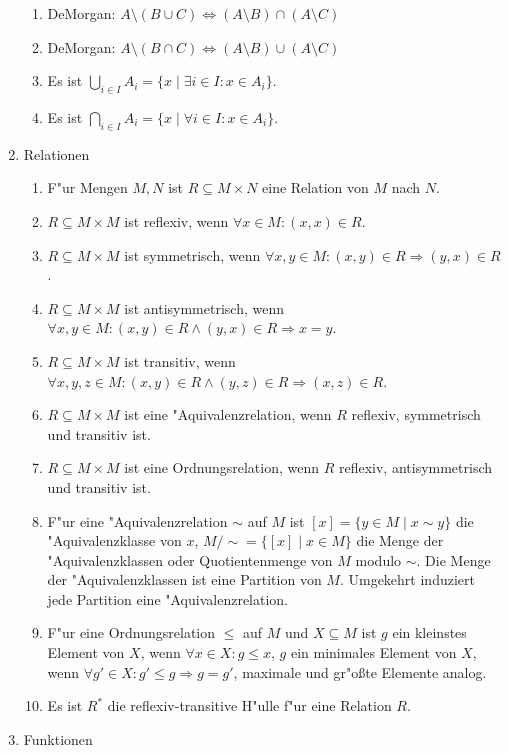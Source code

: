 \begin{enumerate}
\begin{enumerate}
    \item DeMorgan: $A\setminus (B\cup C) \Leftrightarrow (A\setminus B) \cap (A\setminus C)$
    \item DeMorgan: $A\setminus (B\cap C) \Leftrightarrow (A\setminus B) \cup (A\setminus C)$
    \item Es ist $\bigcup_{i\in I}A_i = \{x\mid \exists i\in I: x\in A_i\}$. 
    \item Es ist $\bigcap_{i\in I}A_i = \{x\mid\forall i\in I: x\in A_i\}$.
\end{enumerate}
\item Relationen
\begin{enumerate}
    \item F"ur Mengen $M,N$ ist $R\subseteq M\times N$ eine Relation von $M$ nach $N$.
    \item $R\subseteq M\times M$ ist reflexiv, wenn $\forall x\in M: (x,x)\in R$.
    \item $R\subseteq M\times M$ ist symmetrisch, wenn $\forall x,y\in M: (x,y)\in R \Rightarrow (y,x)\in R$.
    \item $R\subseteq M\times M$ ist antisymmetrisch, wenn $\forall x,y\in M: (x,y)\in R \wedge (y,x)\in R \Rightarrow x=y$.
    \item $R\subseteq M\times M$ ist transitiv, wenn $\forall x,y,z\in M: (x,y)\in R \wedge (y,z)\in R \Rightarrow (x,z)\in R$.
    \item $R\subseteq M\times M$ ist eine "Aquivalenzrelation, wenn $R$ reflexiv, symmetrisch und transitiv ist.
    \item $R\subseteq M\times M$ ist eine Ordnungsrelation, wenn $R$ reflexiv, antisymmetrisch und transitiv ist.
    \item F"ur eine "Aquivalenzrelation $\sim$ auf $M$ ist $[x]=\{y\in M\mid x\sim y\}$ die "Aquivalenzklasse von $x$, $M/\sim = \{[x]\mid x\in M\}$ die Menge der "Aquivalenzklassen oder Quotientenmenge von $M$ modulo $\sim$. Die Menge der "Aquivalenzklassen ist eine Partition von $M$. Umgekehrt induziert jede Partition eine "Aquivalenzrelation.
    \item F"ur eine Ordnungsrelation $\leq$ auf $M$ und $X\subseteq M$ ist $g$ ein kleinstes Element von $X$, wenn $\forall x\in X: g\leq x$, $g$ ein minimales Element von $X$, wenn $\forall g'\in X: g'\leq g\Rightarrow g=g'$, maximale und gr"o{\ss}te Elemente analog.
    \item Es ist $R^*$ die reflexiv-transitive H"ulle f"ur eine Relation $R$.
\end{enumerate}
\item Funktionen

\end{enumerate}
